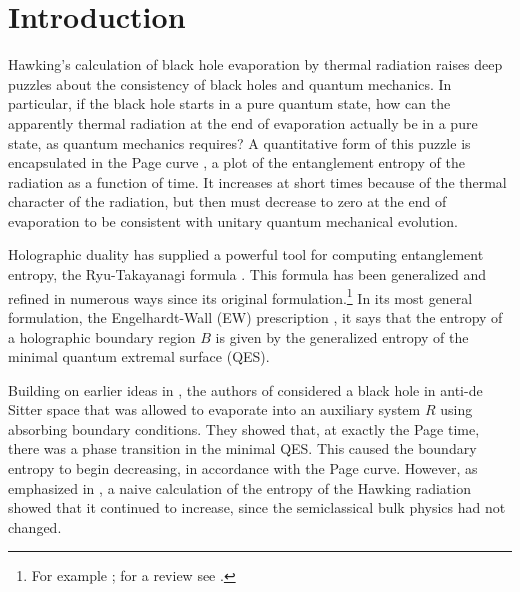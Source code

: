 \documentclass[11pt]{article}
\numberwithin{equation}{section}
\begin{document}
\section{Introduction}
Hawking's calculation \cite{hawking1975} of black hole evaporation by thermal radiation raises deep puzzles about the consistency of black holes and quantum mechanics.   In particular, if the black hole starts in a pure quantum state, how can the apparently thermal radiation at the end of evaporation actually be in a pure state, as quantum mechanics requires?  A quantitative form of this puzzle is encapsulated in the Page curve \cite{Page:1993df}, a plot of the entanglement entropy of the radiation as a function of time.   It increases at short times because of the thermal character of the radiation, but then must decrease to zero at the end of evaporation to be consistent with unitary quantum mechanical evolution.

Holographic duality has supplied a powerful tool for computing entanglement entropy, the Ryu-Takayanagi formula \cite{Ryu:2006bv}.  This formula has been generalized and refined in numerous ways since its original formulation.\footnote{For example \cite{Headrick:2007km,Hubeny:2007xt,Wall:2012uf,Lewkowycz:2013nqa,Faulkner:2013ana,Dong:2016hjy}; for a review see \cite{Rangamani:2016dms}.} In its most general formulation, the Engelhardt-Wall (EW) prescription \cite{Engelhardt:2014gca}, it says that the entropy of a holographic boundary region $B$ is given by the generalized entropy of the minimal quantum extremal surface (QES).

Building on earlier ideas in \cite{Almheiri:2018xdw, Hayden:2018khn}, the authors of \cite{Penington:2019npb, Almheiri:2019psf} considered a black hole in anti-de Sitter space that was allowed to evaporate into an auxiliary system $R$ using absorbing boundary conditions.  They showed that, at exactly the Page time, there was a phase transition in the minimal QES. This caused the boundary entropy to begin decreasing, in accordance with the Page curve. However, as emphasized in \cite{Almheiri:2019psf}, a naive calculation of the entropy of the Hawking radiation showed that it continued to increase, since the semiclassical bulk physics had not changed. 
\end{document}
